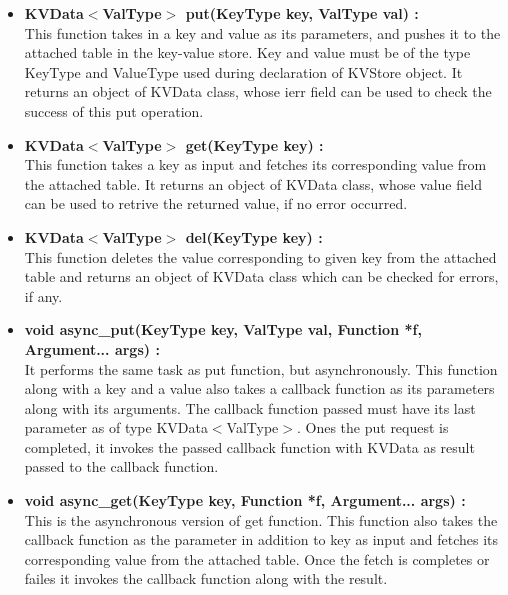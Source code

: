 \documentclass[11pt]{article}
\begin{document}
\begin{itemize}
\begin{itemize}
\item \textbf{KVData$<$ValType$>$ put(KeyType key, ValType val) :}\\
This function takes in a key and value as its parameters, and pushes it to the attached table in the key-value store. Key and value must be of the type KeyType and ValueType used during declaration of KVStore object. It returns an object of KVData class, whose ierr field can be used to check the success of this put operation.\\

\item \textbf{KVData$<$ValType$>$ get(KeyType key) :}\\
This function takes a key as input and fetches its corresponding value from the attached table. It returns an object of KVData class, whose value field can be used to retrive the returned value, if no error occurred.\\

\item \textbf{KVData$<$ValType$>$ del(KeyType key) :}\\
This function deletes the value corresponding to given key from the attached table and returns an object of KVData class which can be checked for errors, if any.\\

\item \textbf{void async\_put(KeyType key, ValType val, Function *f, Argument... args) :}\\
It performs the same task as put function, but asynchronously.
This function along with a key and a value also takes a callback function as its parameters along with its arguments. The callback function passed must have its last parameter as of type KVData$<$ValType$>$. Ones the put request is completed, it invokes the passed callback function with KVData as result passed to the callback function.\\

\item \textbf{void async\_get(KeyType key, Function *f, Argument... args) :}\\
This is the asynchronous version of get function. This function also takes the callback function as the parameter in addition to key as input and fetches its corresponding value from the attached table. Once the fetch is completes or failes it invokes the callback function along with the result.\\


\end{itemize}
\end{itemize}
\end{document}
